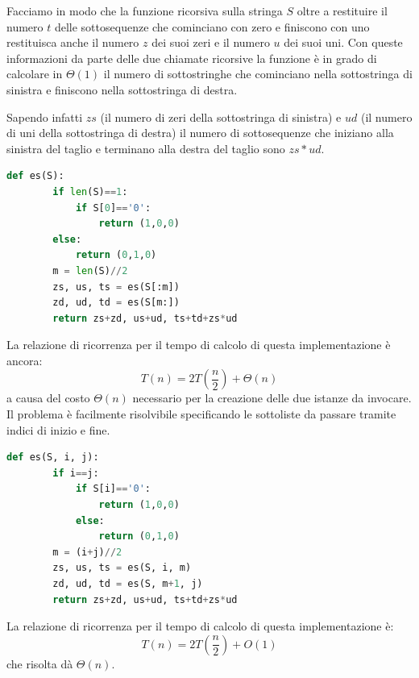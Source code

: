 Facciamo in modo che la funzione ricorsiva sulla stringa $S$ oltre a restituire il numero $t$ delle sottosequenze che cominciano con zero e finiscono con uno restituisca anche il numero $z$ dei suoi zeri e il numero $u$ dei suoi uni. Con queste informazioni da parte delle due chiamate ricorsive la funzione è in grado di calcolare in $\Theta(1)$ il numero di sottostringhe che cominciano nella sottostringa di sinistra e finiscono nella sottostringa di destra.

Sapendo infatti $zs$ (il numero di zeri della sottostringa di sinistra) e $ud$ (il numero di uni della sottostringa di destra) il numero di sottosequenze che iniziano alla sinistra del taglio e terminano alla destra del taglio sono $zs*ud$.

\begin{lstlisting}[language=Python]
    def es(S):
        if len(S)==1:
            if S[0]=='0': 
                return (1,0,0)
        else:
            return (0,1,0)
        m = len(S)//2
        zs, us, ts = es(S[:m]) 
        zd, ud, td = es(S[m:])
        return zs+zd, us+ud, ts+td+zs*ud
\end{lstlisting}
La relazione di ricorrenza per il tempo di calcolo di questa implementazione è ancora:
\begin{equation*}
    T(n) = 2T\left(\frac{n}{2}\right) + \Theta(n)
\end{equation*}
a causa del costo $\Theta(n)$ necessario per la creazione delle due istanze da invocare.
Il problema è facilmente risolvibile specificando le sottoliste da passare tramite indici di inizio e fine.

\begin{lstlisting}[language=Python]
    def es(S, i, j):
        if i==j:
            if S[i]=='0':
                return (1,0,0)
            else: 
                return (0,1,0)
        m = (i+j)//2
        zs, us, ts = es(S, i, m) 
        zd, ud, td = es(S, m+1, j)
        return zs+zd, us+ud, ts+td+zs*ud
\end{lstlisting}
La relazione di ricorrenza per il tempo di calcolo di questa implementazione è:
\begin{equation*}
    T(n) = 2T\left(\frac{n}{2}\right)+O(1)    
\end{equation*}
che risolta dà $\Theta(n)$.

